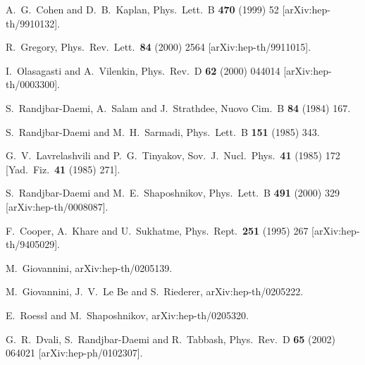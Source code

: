 \documentclass[a4paper,12pt]{article}
\begin{document}
\begin{thebibliography}{99}
A.~G.~Cohen and D.~B.~Kaplan,
Phys.\ Lett.\ B {\bf 470} (1999) 52
[arXiv:hep-th/9910132].

R.~Gregory,
Phys.\ Rev.\ Lett.\  {\bf 84} (2000) 2564
[arXiv:hep-th/9911015].

I.~Olasagasti and A.~Vilenkin,
Phys.\ Rev.\ D {\bf 62} (2000) 044014
[arXiv:hep-th/0003300].

S.~Randjbar-Daemi, A.~Salam and J.~Strathdee,
Nuovo Cim.\ B {\bf 84} (1984) 167.

S.~Randjbar-Daemi and M.~H.~Sarmadi,
Phys.\ Lett.\ B {\bf 151} (1985) 343.

G.~V.~Lavrelashvili and P.~G.~Tinyakov,
Sov.\ J.\ Nucl.\ Phys.\  {\bf 41} (1985) 172
[Yad.\ Fiz.\  {\bf 41} (1985) 271].

S.~Randjbar-Daemi and M.~E.~Shaposhnikov,
Phys.\ Lett.\ B {\bf 491} (2000) 329
[arXiv:hep-th/0008087].

F.~Cooper, A.~Khare and U.~Sukhatme,
Phys.\ Rept.\  {\bf 251} (1995) 267
[arXiv:hep-th/9405029].

M.~Giovannini,
arXiv:hep-th/0205139.

M.~Giovannini, J.~V.~Le Be and S.~Riederer,
arXiv:hep-th/0205222.

E.~Roessl and M.~Shaposhnikov,
arXiv:hep-th/0205320.

G.~R.~Dvali, S.~Randjbar-Daemi and R.~Tabbash,
Phys.\ Rev.\ D {\bf 65} (2002) 064021
[arXiv:hep-ph/0102307].

\end{thebibliography}
\end{document}
